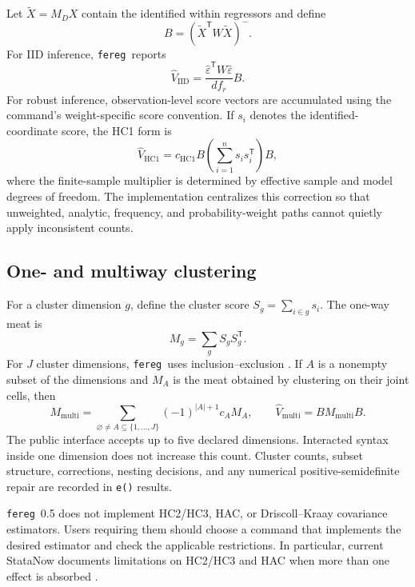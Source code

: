 \documentclass[11pt]{article}
\newcommand{\fereg}{\texttt{fereg}}
\newcommand{\trans}{\mathsf{T}}
\begin{document}
Let $\widetilde X=M_DX$ contain the identified within regressors and define
\[
  B=(\widetilde X^\trans W\widetilde X)^{-}.
\]
For IID inference, \fereg\ reports
\begin{equation}
  \widehat V_{\mathrm{IID}}
  = \frac{\widehat\varepsilon^\trans W\widehat\varepsilon}{df_r}B.
  \label{eq:iid}
\end{equation}
For robust inference, observation-level score vectors are accumulated using
the command's weight-specific score convention.  If $s_i$ denotes the
identified-coordinate score, the HC1 form is
\begin{equation}
  \widehat V_{\mathrm{HC1}}
  = c_{\mathrm{HC1}} B
      \left(\sum_{i=1}^{n}s_i s_i^\trans\right)B,
  \label{eq:hc1}
\end{equation}
where the finite-sample multiplier is determined by effective sample and
model degrees of freedom.  The implementation centralizes this correction so
that unweighted, analytic, frequency, and probability-weight paths cannot
quietly apply inconsistent counts.

\subsection{One- and multiway clustering}

For a cluster dimension $g$, define the cluster score
$S_g=\sum_{i\in g}s_i$.  The one-way meat is
\[
  M_g=\sum_g S_gS_g^\trans.
\]
For $J$ cluster dimensions, \fereg\ uses inclusion--exclusion
\citep{cameron2011robust}.  If $A$ is a nonempty subset of the dimensions and
$M_A$ is the meat obtained by clustering on their joint cells, then
\begin{equation}
  M_{\mathrm{multi}}
  = \sum_{\varnothing\ne A\subseteq\{1,\ldots,J\}}
      (-1)^{|A|+1}c_A M_A,
  \qquad
  \widehat V_{\mathrm{multi}}=BM_{\mathrm{multi}}B.
  \label{eq:multiway}
\end{equation}
The public interface accepts up to five declared dimensions.  Interacted
syntax inside one dimension does not increase this count.  Cluster counts,
subset structure, corrections, nesting decisions, and any numerical
positive-semidefinite repair are recorded in \texttt{e()} results.

\fereg\ 0.5 does not implement HC2/HC3, HAC, or Driscoll--Kraay covariance
estimators.  Users requiring them should choose a command that implements the
desired estimator and check the applicable restrictions.  In particular,
current StataNow documents limitations on HC2/HC3 and HAC when more than one
effect is absorbed \citep{stata2025areg,stata2025xtreg,statanow2026vce}.
\end{document}
